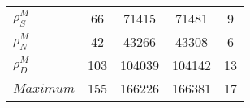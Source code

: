 \begin{center}
\begin{longtable}{lcccc}
$ {\rho^{M}_{S}}       $	 & 	                   66	 & 	                71415	 & 	                71481	 & 	                    9 \\ 
$ {\rho^{M}_{N}}       $	 & 	                   42	 & 	                43266	 & 	                43308	 & 	                    6 \\ 
$ {\rho^{M}_{D}}       $	 & 	                  103	 & 	               104039	 & 	               104142	 & 	                   13 \\ 
$Maximum               $	 & 	                  155	 & 	               166226	 & 	               166381	 & 	                   17 \\ 
\end{longtable}
 \end{center}

